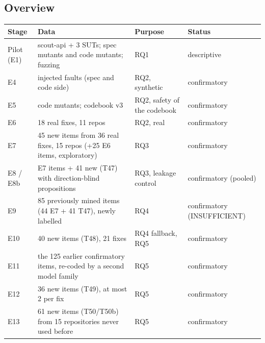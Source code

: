 \documentclass[acmsmall,screen,review,anonymous]{acmart}
\begin{document}
\subsection{Overview}
\begin{table}[t]
\small
\begin{tabularx}{\linewidth}{lXXX}
\toprule
Stage & Data & Purpose & Status \\
\midrule
Pilot (E1) & scout-api + 3 SUTs; spec mutants and code mutants; fuzzing & RQ1 & descriptive \\
E4 & injected faults (spec and code side) & RQ2, synthetic & confirmatory \\
E5 & code mutants; codebook v3 & RQ2, safety of the codebook & confirmatory \\
E6 & 18 real fixes, 11 repos & RQ2, real & confirmatory \\
E7 & 45 new items from 36 real fixes, 15 repos (+25 E6 items, exploratory) & RQ3 & confirmatory \\
E8 / E8b & E7 items + 41 new (T47) with direction-blind propositions & RQ3, leakage control & confirmatory (pooled) \\
E9 & 85 previously mined items (44 E7 + 41 T47), newly labelled & RQ4 & confirmatory (INSUFFICIENT) \\
E10 & 40 new items (T48), 21 fixes & RQ4 fallback, RQ5 & confirmatory \\
E11 & the 125 earlier confirmatory items, re-coded by a second model family & RQ5 & confirmatory \\
E12 & 36 new items (T49), at most 2 per fix & RQ5 & confirmatory \\
E13 & 61 new items (T50/T50b) from 15 repositories never used before & RQ5 & confirmatory \\
\bottomrule
\end{tabularx}
\end{table}
\end{document}
